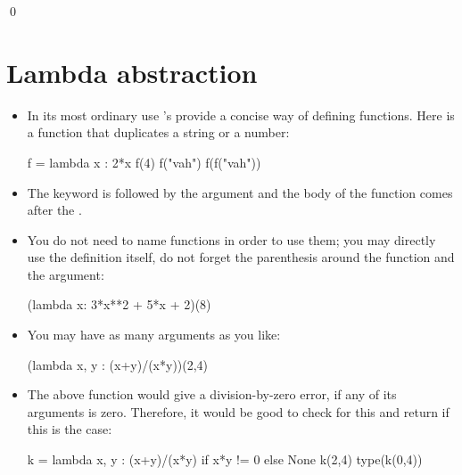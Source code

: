 \documentclass[a4paper]{article}
\begin{document}
{\begin{itemize}
\begin{uexample}
\qed
\end{uexample}

\end{itemize}

\section{Lambda abstraction}

\begin{itemize}
\item In its most ordinary use 's provide a concise way of defining
functions. Here is a function that duplicates a string or a number:

\begin{ucodeframe}
\begin{pyconsole}
f = lambda x : 2*x 
f(4)
f("vah")
f(f("vah"))
\end{pyconsole}
\end{ucodeframe}

\item The  keyword is followed by the argument and the body of the
function comes after the \pyv{:}.



\item You do not need to name  functions in order to use them; you
may directly use the definition itself, do not forget the parenthesis around the
function and the argument:

\begin{ucodeframe}
\begin{pyconsole}
(lambda x: 3*x**2 + 5*x + 2)(8)
\end{pyconsole}
\end{ucodeframe}

\item You may have as many arguments as you like:

\begin{ucodeframe}
\begin{pyconsole}
(lambda x, y : (x+y)/(x*y))(2,4)
\end{pyconsole}
\end{ucodeframe}

\item The above function would give a division-by-zero error, if any of its
arguments is zero. Therefore, it would be good to check for this and return
 if this is the case:

\begin{ucodeframe}
\begin{pyconsole}
k = lambda x, y : (x+y)/(x*y) if x*y != 0 else None
k(2,4)
type(k(0,4))
\end{pyconsole}
\end{ucodeframe}


\end{itemize}}
\end{document}
